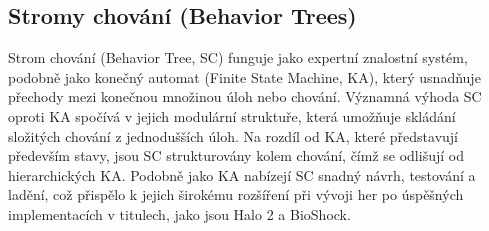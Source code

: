 \newpage

\subsection{Stromy chování (Behavior Trees)}
Strom chování (Behavior Tree, SC)\cite{Colledanchise2018} funguje jako expertní znalostní systém, podobně jako konečný automat (Finite State Machine, KA), který usnadňuje přechody mezi konečnou množinou úloh nebo chování. Významná výhoda SC oproti KA spočívá v jejich modulární struktuře, která umožňuje skládání složitých chování z jednodušších úloh. Na rozdíl od KA, které představují především stavy, jsou SC strukturovány kolem chování, čímž se odlišují od hierarchických KA. Podobně jako KA nabízejí SC snadný návrh, testování a ladění, což přispělo k jejich širokému rozšíření při vývoji her po úspěšných implementacích v titulech, jako jsou Halo 2\cite{Isla2005} a BioShock.

